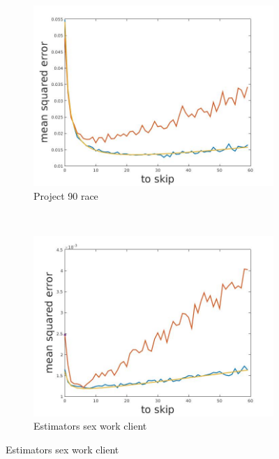 \documentclass[12pt]{report}
\begin{document}
\begin{figure}[h]
    \begin{subfigure}[b]{0.3\textwidth}
        \includegraphics[width=\textwidth]{estimators_race}
        \caption{ Project 90 race}

    \end{subfigure}
    ~
    \begin{subfigure}[b]{0.3\textwidth}
        \includegraphics[width=\textwidth]{estimators_sexWorkClient}
        \caption{ Estimators sex work client }


\end{subfigure}
\end{figure}
\end{document}

